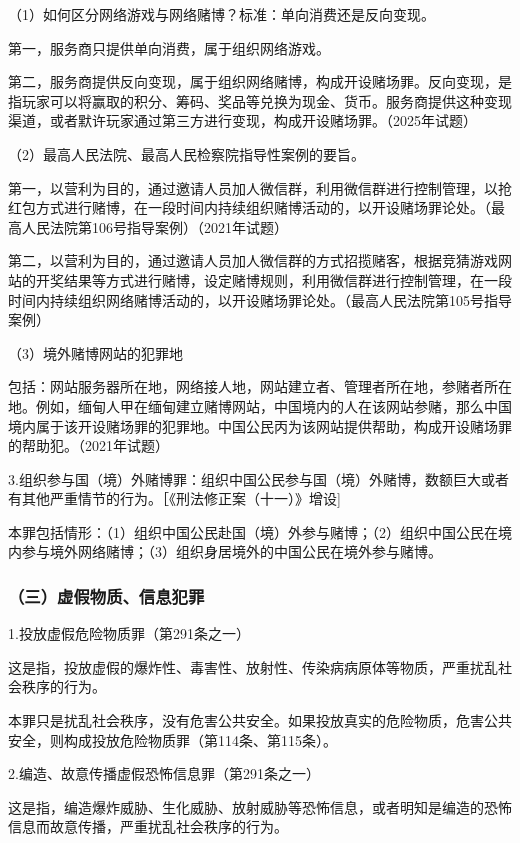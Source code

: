 （1）如何区分网络游戏与网络赌博？标准：单向消费还是反向变现。

第一，服务商只提供单向消费，属于组织网络游戏。

第二，服务商提供反向变现，属于组织网络赌博，构成开设赌场罪。反向变现，是指玩家可以将赢取的积分、筹码、奖品等兑换为现金、货币。服务商提供这种变现渠道，或者默许玩家通过第三方进行变现，构成开设赌场罪。（2025年试题）

（2）最高人民法院、最高人民检察院指导性案例的要旨。

第一，以营利为目的，通过邀请人员加人微信群，利用微信群进行控制管理，以抢红包方式进行赌博，在一段时间内持续组织赌博活动的，以开设赌场罪论处。（最高人民法院第106号指导案例）（2021年试题）

第二，以营利为目的，通过邀请人员加人微信群的方式招揽赌客，根据竞猜游戏网站的开奖结果等方式进行赌博，设定赌博规则，利用微信群进行控制管理，在一段时间内持续组织网络赌博活动的，以开设赌场罪论处。（最高人民法院第105号指导案例）

（3）境外赌博网站的犯罪地

包括：网站服务器所在地，网络接人地，网站建立者、管理者所在地，参赌者所在地。例如，缅甸人甲在缅甸建立赌博网站，中国境内的人在该网站参赌，那么中国境内属于该开设赌场罪的犯罪地。中国公民丙为该网站提供帮助，构成开设赌场罪的帮助犯。（2021年试题）

3.组织参与国（境）外赌博罪：组织中国公民参与国（境）外赌博，数额巨大或者有其他严重情节的行为。［《刑法修正案（十一）》增设]

本罪包括情形：（1）组织中国公民赴国（境）外参与赌博；（2）组织中国公民在境内参与境外网络赌博；（3）组织身居境外的中国公民在境外参与赌博。

\subsubsection*{（三）虚假物质、信息犯罪}

1.投放虚假危险物质罪（第291条之一）

这是指，投放虚假的爆炸性、毒害性、放射性、传染病病原体等物质，严重扰乱社会秩序的行为。

本罪只是扰乱社会秩序，没有危害公共安全。如果投放真实的危险物质，危害公共安全，则构成投放危险物质罪（第114条、第115条）。

2.编造、故意传播虚假恐怖信息罪（第291条之一）

这是指，编造爆炸威胁、生化威胁、放射威胁等恐怖信息，或者明知是编造的恐怖信息而故意传播，严重扰乱社会秩序的行为。

